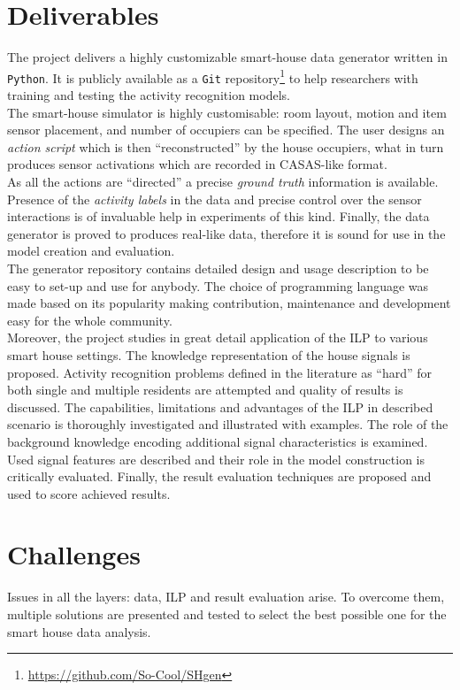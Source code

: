\documentclass[10pt, a4paper, pdflatex, leqno, twoside, openright]{report}
\begin{document}
\section{Deliverables}
The project delivers a highly customizable smart-house data generator written in \texttt{Python}. It is publicly available as a \texttt{Git} repository\footnote{\noindent\url{https://github.com/So-Cool/SHgen}} to help researchers with training and testing the activity recognition models.\\
The smart-house simulator is highly customisable: room layout, motion and item sensor placement, and number of occupiers can be specified. The user designs an \emph{action script} which is then ``reconstructed'' by the house occupiers, what in turn produces sensor activations which are recorded in CASAS-like format.\\
As all the actions are ``directed'' a precise \emph{ground truth} information is available. Presence of the \emph{activity labels} in the data and precise control over the sensor interactions is of invaluable help in experiments of this kind. Finally, the data generator is proved to produces real-like data, therefore it is sound for use in the model creation and evaluation.\\
The generator repository contains detailed design and usage description to be easy to set-up and use for anybody. The choice of programming language was made based on its popularity making contribution, maintenance and development easy for the whole community.\\

Moreover, the project studies in great detail application of the ILP to various smart house settings. The knowledge representation of the house signals is proposed. Activity recognition problems defined in the literature as ``hard'' for both single and multiple residents are attempted and quality of results is discussed. The capabilities, limitations and advantages of the ILP in described scenario is thoroughly investigated and illustrated with examples. The role of the background knowledge encoding additional signal characteristics is examined. Used signal features are described and their role in the model construction is critically evaluated. Finally, the result evaluation techniques are proposed and used to score achieved results.

\section{Challenges}
Issues in all the layers: data, ILP and result evaluation arise. To overcome them, multiple solutions are presented and tested to select the best possible one for the smart house data analysis.\\
\end{document}
